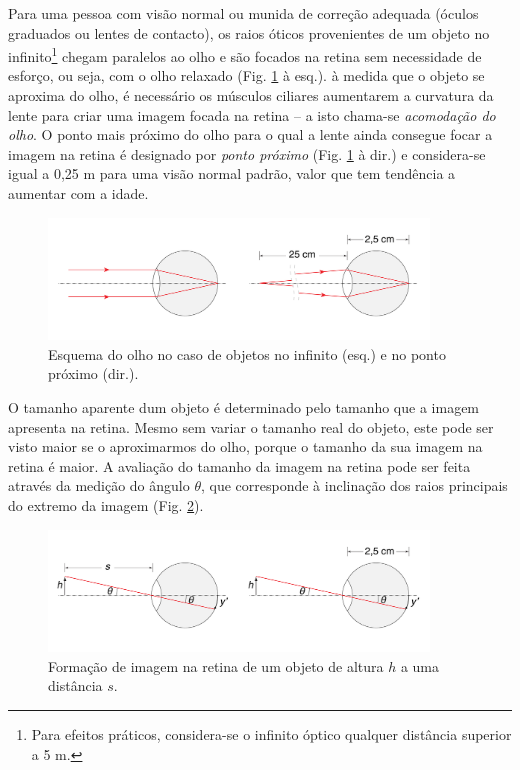 \documentclass[12pt,a4paper,oneside]{paper}
\begin{document}
Para uma pessoa com visão normal ou munida de correção adequada (óculos graduados ou lentes de contacto), os raios óticos
provenientes de um objeto no infinito\footnote{Para efeitos práticos, considera-se o infinito óptico qualquer distância
superior a 5 m.} chegam paralelos ao olho e são focados na retina sem necessidade de esforço, ou seja, com o olho relaxado
(Fig. \ref{fig:olho-2} à esq.). à medida que o objeto se aproxima do olho, é necessário os músculos ciliares aumentarem a
curvatura da lente para criar uma imagem focada na retina -- a isto chama-se \emph{acomodação do olho}. O ponto mais próximo
do olho para o qual a lente ainda consegue focar a imagem na retina é designado por \emph{ponto próximo} (Fig. \ref{fig:olho-2} à dir.)
e considera-se igual a 0,25 m para uma visão normal padrão, valor que tem tendência a aumentar com a idade.

\begin{figure}[H]
	\centering 
	\includegraphics[width=0.9\textwidth]{./otica_images/olho-2}
	\caption{Esquema do olho no caso de objetos no infinito (esq.) e no ponto próximo (dir.). \label{fig:olho-2}} 
\end{figure}

O tamanho aparente dum objeto é determinado pelo tamanho que a imagem apresenta na retina. Mesmo sem variar o tamanho
real do objeto, este pode ser visto maior se o aproximarmos do olho, porque o tamanho da sua imagem na retina é maior.
A avaliação do tamanho da imagem na retina pode ser feita através da medição do ângulo $\theta$, que corresponde à inclinação
dos raios principais do extremo da imagem (Fig. \ref{fig:olho-3}).

\begin{figure}[H]
	\centering 
	\includegraphics[width=0.9\textwidth]{./otica_images/olho-3}
	\caption{Formação de imagem na retina de um objeto de altura $h$ a uma distância $s$. \label{fig:olho-3}} 
\end{figure}
\end{document}
